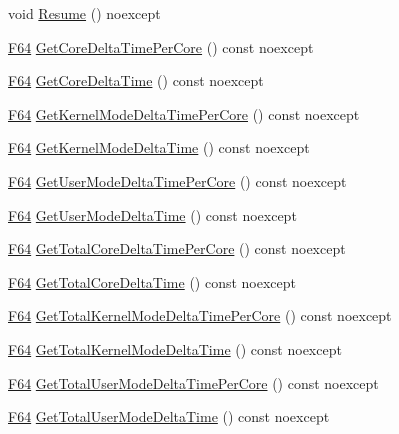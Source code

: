 \begin{DoxyCompactItemize}
\item 
void \hyperlink{classmage_1_1_c_p_u_timer_a8285a7306896f52adb093284d6c9da4d}{Resume} () noexcept
\item 
\hyperlink{namespacemage_ad26233bbec640deda836e572c1a23708}{F64} \hyperlink{classmage_1_1_c_p_u_timer_a2b088ff4194fd2a5fd7201e8de4dd1da}{Get\+Core\+Delta\+Time\+Per\+Core} () const noexcept
\item 
\hyperlink{namespacemage_ad26233bbec640deda836e572c1a23708}{F64} \hyperlink{classmage_1_1_c_p_u_timer_a5d033c20772755d6a6693e1b495cf589}{Get\+Core\+Delta\+Time} () const noexcept
\item 
\hyperlink{namespacemage_ad26233bbec640deda836e572c1a23708}{F64} \hyperlink{classmage_1_1_c_p_u_timer_a7c503d9d66548e74ea29d887ee1ddcd3}{Get\+Kernel\+Mode\+Delta\+Time\+Per\+Core} () const noexcept
\item 
\hyperlink{namespacemage_ad26233bbec640deda836e572c1a23708}{F64} \hyperlink{classmage_1_1_c_p_u_timer_a806439a1ca61d81c877e9823b9cb0705}{Get\+Kernel\+Mode\+Delta\+Time} () const noexcept
\item 
\hyperlink{namespacemage_ad26233bbec640deda836e572c1a23708}{F64} \hyperlink{classmage_1_1_c_p_u_timer_a8838f9a875f227c6783e107986c0adfc}{Get\+User\+Mode\+Delta\+Time\+Per\+Core} () const noexcept
\item 
\hyperlink{namespacemage_ad26233bbec640deda836e572c1a23708}{F64} \hyperlink{classmage_1_1_c_p_u_timer_aa6873914da66a6be49ff69253f236f3e}{Get\+User\+Mode\+Delta\+Time} () const noexcept
\item 
\hyperlink{namespacemage_ad26233bbec640deda836e572c1a23708}{F64} \hyperlink{classmage_1_1_c_p_u_timer_af098c9df9e25e29beee131bb1de8c482}{Get\+Total\+Core\+Delta\+Time\+Per\+Core} () const noexcept
\item 
\hyperlink{namespacemage_ad26233bbec640deda836e572c1a23708}{F64} \hyperlink{classmage_1_1_c_p_u_timer_adb10ccea8664d1400d88953192a5a111}{Get\+Total\+Core\+Delta\+Time} () const noexcept
\item 
\hyperlink{namespacemage_ad26233bbec640deda836e572c1a23708}{F64} \hyperlink{classmage_1_1_c_p_u_timer_ab1128ed37f45445afdfc6d539d721616}{Get\+Total\+Kernel\+Mode\+Delta\+Time\+Per\+Core} () const noexcept
\item 
\hyperlink{namespacemage_ad26233bbec640deda836e572c1a23708}{F64} \hyperlink{classmage_1_1_c_p_u_timer_a38cb7adfd830f9d8c7a567f30ebcdf24}{Get\+Total\+Kernel\+Mode\+Delta\+Time} () const noexcept
\item 
\hyperlink{namespacemage_ad26233bbec640deda836e572c1a23708}{F64} \hyperlink{classmage_1_1_c_p_u_timer_a7eb10c5f750f03ad5e19f0b29ee4851c}{Get\+Total\+User\+Mode\+Delta\+Time\+Per\+Core} () const noexcept
\item 
\hyperlink{namespacemage_ad26233bbec640deda836e572c1a23708}{F64} \hyperlink{classmage_1_1_c_p_u_timer_aeff891594a11dba36c73442d04a430c8}{Get\+Total\+User\+Mode\+Delta\+Time} () const noexcept
\end{DoxyCompactItemize}
